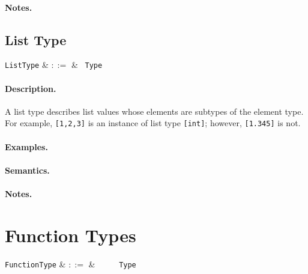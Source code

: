\paragraph{Notes.} 


\subsection{List Type}

\begin{syntax}
  \verb+ListType+ & $::=$ & \token{[} \ \verb+Type+ \ \token{]}\\
\end{syntax}

\paragraph{Description.}  A list type describes list values whose
elements are subtypes of the element type. For example,
\lstinline{[1,2,3]} is an instance of list type \lstinline{[int]}; however, \lstinline{[1.345]} is not.

\paragraph{Examples.}

\paragraph{Semantics.}

\paragraph{Notes.} 


\section{Function Types}

\begin{syntax}
  \verb+FunctionType+ & $::=$ & \ \token{(}\
  \ \token{)}\ \token{=>}\ \verb+Type+\\
\end{syntax}

